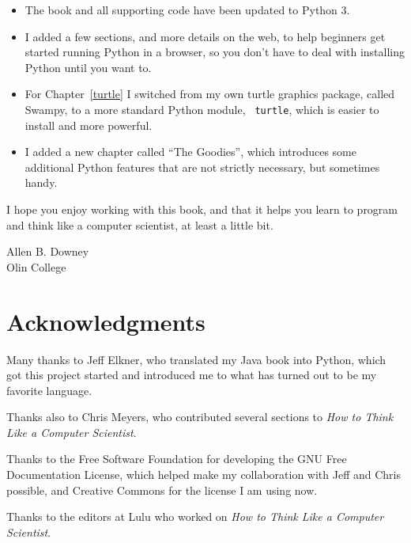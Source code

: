 \documentclass[10pt]{book}
\begin{document}
\begin{itemize}

\item The book and all supporting code have been updated to Python 3.

\item I added a few sections, and more details on the web, to help
beginners get started running Python in a browser, so you don't have
to deal with installing Python until you want to.

\item For Chapter~\ref{turtle} I switched from my own turtle graphics
  package, called Swampy, to a more standard Python module, {\tt
    turtle}, which is easier to install and more powerful.

\item I added a new chapter called ``The Goodies'', which introduces
some additional Python features that are not strictly necessary, but
sometimes handy.

\end{itemize}

I hope you enjoy working with this book, and that it helps
you learn to program and think like
a computer scientist, at least a little bit.


Allen B. Downey \\

Olin College \\


\section*{Acknowledgments}

Many thanks to Jeff Elkner, who
translated my Java book into Python, which got this project
started and introduced me to what has turned out to be my
favorite language.

Thanks also to Chris Meyers, who contributed several sections
to {\em How to Think Like a Computer Scientist}.

Thanks to the Free Software Foundation for developing
the GNU Free Documentation License, which helped make
my collaboration with Jeff and Chris possible, and Creative
Commons for the license I am using now.

Thanks to the editors at Lulu who worked on
{\em How to Think Like a Computer Scientist}.
\end{document}
